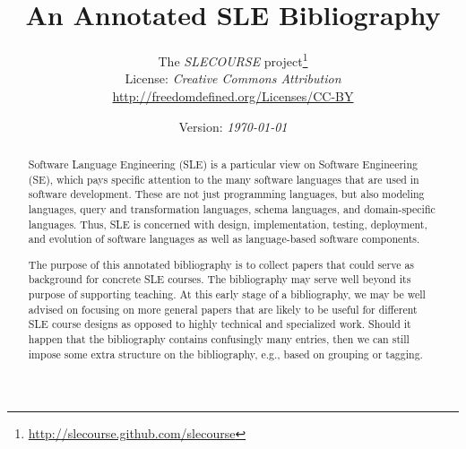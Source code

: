 \documentclass[12pt]{article}
\begin{document}
\title{An Annotated SLE Bibliography}

\author{The \emph{SLECOURSE} project\thanks{\url{http://slecourse.github.com/slecourse}}\\
License:  \emph{Creative Commons Attribution}\\\url{http://freedomdefined.org/Licenses/CC-BY}}

\date{Version: \emph{\today}}

\maketitle

\begin{abstract}
  Software Language Engineering (SLE) is a particular view on Software
  Engineering (SE), which pays specific attention to the many software
  languages that are used in software development.  These are not just
  programming languages, but also modeling languages, query and
  transformation languages, schema languages, and domain-specific
  languages. Thus, SLE is concerned with design, implementation,
  testing, deployment, and evolution of software languages as well as
  language-based software components.

  \medskip

  The purpose of this annotated bibliography is to collect papers that
  could serve as background for concrete SLE courses. The bibliography
  may serve well beyond its purpose of supporting teaching. At this early
  stage of a bibliography, we may be well advised on focusing on more
  general papers that are likely to be useful for different SLE course
  designs as opposed to highly technical and specialized work. Should
  it happen that the bibliography contains confusingly many entries,
  then we can still impose some extra structure on the bibliography,
  e.g., based on grouping or tagging.
\end{abstract}

\newpage

\nocite{*}



\end{document}
